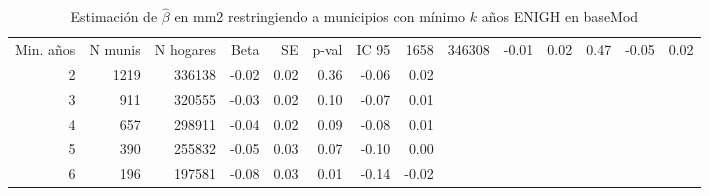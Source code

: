 \begin{table}[ht]
\centering
\caption{Estimación de $\hat{\beta}$ en mm2 restringiendo a municipios con mínimo $k$ años ENIGH en baseMod} 
\label{tab:id_ID3_beta_por_umbral_anios}
\begin{tabular}{rrrrrrrr}
  \toprule
Min. años & N munis & N hogares & Beta & SE & p-val & IC 95%
   & 1658 & 346308 & -0.01 & 0.02 & 0.47 & -0.05 & 0.02 \\ 
    2 & 1219 & 336138 & -0.02 & 0.02 & 0.36 & -0.06 & 0.02 \\ 
    3 & 911 & 320555 & -0.03 & 0.02 & 0.10 & -0.07 & 0.01 \\ 
    4 & 657 & 298911 & -0.04 & 0.02 & 0.09 & -0.08 & 0.01 \\ 
    5 & 390 & 255832 & -0.05 & 0.03 & 0.07 & -0.10 & 0.00 \\ 
    6 & 196 & 197581 & -0.08 & 0.03 & 0.01 & -0.14 & -0.02 \\ 
   \bottomrule
\end{tabular}
\end{table}
